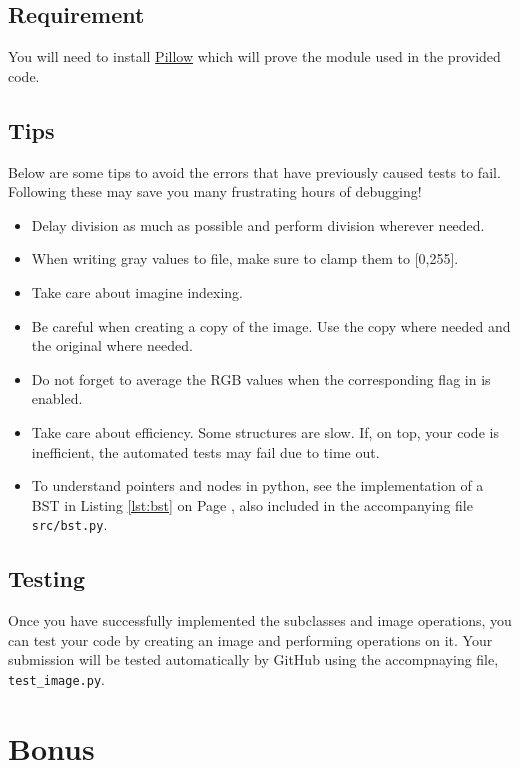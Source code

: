 \documentclass[addpoints]{exam}
\begin{document}
  \subsection{Requirement}

  You will need to install \href{https://pillow.readthedocs.io/en/5.3.x/index.html}{Pillow} which will prove the  module used in the provided code.

  \subsection{Tips}

  Below are some tips to avoid the errors that have previously caused tests to fail. Following these may save you many frustrating hours of debugging!
  \begin{itemize}
  \item Delay division as much as possible and perform  division wherever needed.
  \item When writing gray values to file, make sure to clamp them to [0,255].
  \item Take care about imagine indexing.
  \item Be careful when creating a copy of the image. Use the copy where needed and the original where needed.
  \item Do not forget to average the RGB values when the corresponding flag in  is enabled.
  \item Take care about efficiency. Some structures are slow. If, on top, your code is inefficient, the automated tests may fail due to time out.
  \item To understand pointers and nodes in python, see the implementation of a BST in Listing \ref{lst:bst} on Page \pageref{lst:bst}, also included in the accompanying file \texttt{src/bst.py}.
  \end{itemize}

  \subsection{Testing}

  Once you have successfully implemented the subclasses and image operations, you can test your code by creating an image and performing operations on it. Your submission will be tested automatically by GitHub using the accompnaying  file, \texttt{test\_image.py}.

  \section{Bonus}
\end{document}
